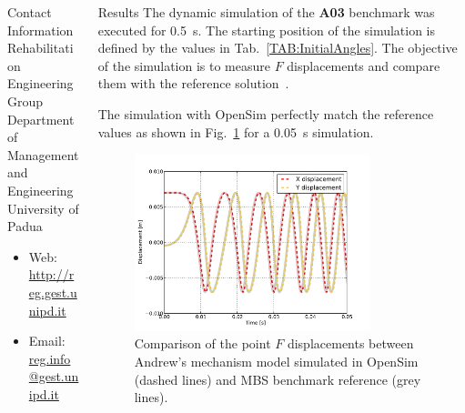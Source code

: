 \documentclass[final]{beamer}
\newlength{\onecolwid}
\newlength{\twocolwid}
\begin{document}
\begin{frame}[t]
\begin{columns}[t]
\begin{column}{\twocolwid}
\begin{columns}[t, totalwidth=\twocolwid]
\begin{column}{\onecolwid}
\begin{alertblock}{Contact Information}
Rehabilitation Engineering Group\\Department of Management and Engineering\\ University of Padua

\begin{itemize}
\item Web: \href{http://reg.gest.unipd.it}{http://reg.gest.unipd.it}
\item Email: \href{mailto:reg.info@gest.unipd.it}{reg.info@gest.unipd.it}
\end{itemize}
 
\end{alertblock}

\end{column}
  

\end{columns}


\end{column}
\begin{column}{\onecolwid} %



\begin{block}{Results}
The dynamic simulation of the \textbf{A03} benchmark was executed for \SI{0.5}{\second}.
The starting position of the simulation is defined by the values in Tab.~\ref{TAB:InitialAngles}. 
The objective of the simulation is to measure $F$ displacements and compare them with the reference solution~\cite{gonzalez2006benchmarking}.

The simulation with OpenSim perfectly match the reference values as shown in Fig.~\ref{FIG:simulationPlot} for a \SI{0.05}{\second} simulation. 


\begin{figure}[h]
\centering
\includegraphics[width=0.8\textwidth]{3MBS_PlotResults.pdf}
\caption{Comparison of the point $F$ displacements between Andrew's mechanism model simulated in OpenSim
(dashed lines) and MBS benchmark reference (grey lines).}
\label{FIG:simulationPlot}
\end{figure}


\end{block}
\end{column}
\end{columns}
\end{frame}
\end{document}
